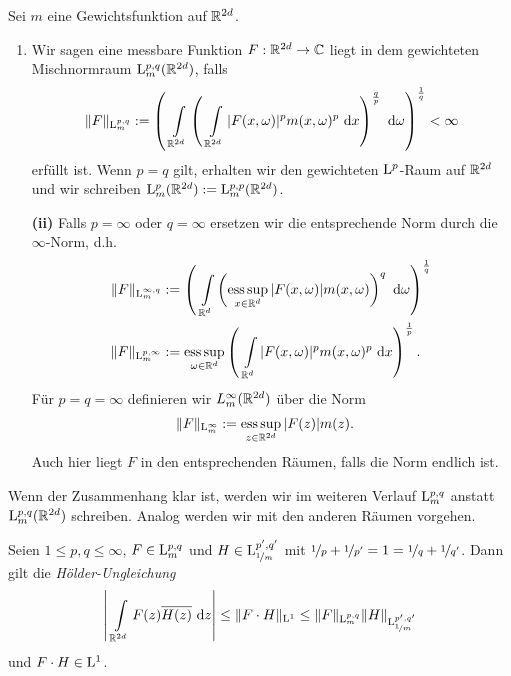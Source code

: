 \begin{df}\label{df:mixed_norm}
	Sei $ m $ eine Gewichtsfunktion auf $ \mathbb{R}^{2d} $. 
	\begin{enumerate}[label =\textbf{(\roman*)}]
		\item 
		Wir sagen eine messbare Funktion $ F : \mathbb{R}^{2d} \to \mathbb{C} $ liegt
		in dem gewichteten Mischnormraum $ \mathrm{L}^{p,q}_m(\mathbb{R}^{2d}) $, falls
		\begin{align*}
		\| F \|_{\mathrm{L}^{p,q}_m} :=
		\left(		
		\ \int \limits_{\mathbb{R}^{2d}} 
		\left(
		\ \int \limits_{\mathbb{R}^{2d}}
		|F(x,\omega)|^p m(x,\omega)^p \text{ d} x 
		\right)^{\frac{q}{p}}
		\text{ d} \omega
		\right)^{\frac{1}{q}} < \infty
		\end{align*}
		erfüllt ist.
		Wenn $ p = q $ gilt, erhalten wir den gewichteten $ \mathrm{L}^p $-Raum auf $ \mathbb{R}^{2d} $ und wir schreiben
		$ \mathrm{L}^p_m(\mathbb{R}^{2d}) := \mathrm{L}^{p,p}_m(\mathbb{R}^{2d}) $.
	\end{enumerate}
	
	\begin{enumerate}
		\item[\textbf{(ii)}]
		Falls $ p = \infty $ oder $ q = \infty $ ersetzen wir die entsprechende Norm durch die $ \infty $-Norm, d.h.
		\begin{align*}
		\| F \|_{\L^{ \infty,q}_m} &:=
		\left(  \
		\int 
		\limits_{\R^{d}}
		\left(
		\esssupp \limits_{x \in \R^d} |F(x,\omega)| m(x,\omega) 
		\right)^{q}
		\td{\omega}
		\right)^{\frac{1}{q}}\\
		\| F \|_{\L^{ p, \infty}_m} &:=
		\esssupp \limits_{\omega \in \R^d}
		\left( \ 
		\int \limits_{\R^{d}}
		|F(x,\omega)|^p m(x,\omega)^p \td{x} 
		\right)^{\frac{1}{p}}.
		\end{align*}
		Für $ p  = q = \infty  $ definieren wir $ L^\infty_m(\mathbb{R}^{2d})  $ über die Norm
		\begin{align*}
		\| F \|_{\mathrm{L}^{ \infty}_m} &:=
		\operatorname*{ess\,sup} \limits_{z \in \mathbb{R}^{2d}}
		|F(z)| m(z).
		\end{align*}
		Auch hier liegt $ F $ in den entsprechenden Räumen, falls die Norm endlich ist.
	\end{enumerate}
\end{df}

Wenn der Zusammenhang klar ist, werden wir im weiteren Verlauf $ \mathrm{L}^{p,q}_m $ anstatt $ \mathrm{L}^{p,q}_m(\mathbb{R}^{2d}) $ schreiben. Analog werden wir mit den anderen Räumen vorgehen.

\begin{sz}\label{hoelder_mixed_norm}
	Seien $ 1 \leq p,q \leq \infty  $, $ F \in \mathrm{L}^{p,q}_m $ und $ H  \in \mathrm{L}^{p^\prime,q^\prime}_{\nicefrac{1}{m}}$
	mit $ \nicefrac{1}{p} + \nicefrac{1}{p^\prime}=1=
	\nicefrac{1}{q} + \nicefrac{1}{q^\prime} $.
	Dann gilt die \textit{Hölder-Ungleichung}
	\begin{align}\label{eq:hoelder_mixed_norm}
	\left|
	\
	\int \limits_{\mathbb{R}^{2d}} 
	F(z) \overline{H(z)} 
	\text{ d} z
	\right|
	\leq 
	\| F \cdot H \|_{\mathrm{L}^1}
	\leq 
	\| F \|_{\mathrm{L}^{p,q}_m} 
	\| H \|_{\mathrm{L}^{p^\prime, q^\prime}_{\nicefrac{1}{m}}}
	\end{align}
	und $ F \cdot H \in \mathrm{L}^1 $.
\end{sz}


